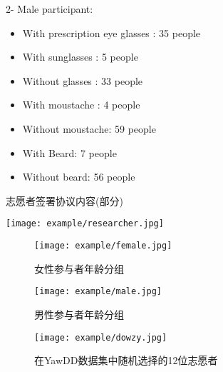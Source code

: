 2- Male participant:
\begin{itemize}
    \item With prescription eye glasses : 35 people
    \item With sunglasses : 5 people
    \item Without glasses : 33 people
    \item With moustache : 4 people
    \item Without moustache: 59 people
    \item With Beard: 7 people
    \item Without beard: 56 people
\end{itemize}

\begin{table}[!htp]

\centering
\caption{志愿者签署协议内容(部分)}
\texttt{[image: example/researcher.jpg]}
\label{table:2-8}

\end{table}


\begin{figure}[!htp]

\centering
\texttt{[image: example/female.jpg]}
\caption{女性参与者年龄分组}
\label{figure:1-7}

\end{figure}

\begin{figure}[!htp]

\centering
\texttt{[image: example/male.jpg]}
\caption{男性参与者年龄分组}
\label{figure:1-8}

\end{figure}

\begin{figure}[!htp]

\centering
\texttt{[image: example/dowzy.jpg]}
\caption{在YawDD数据集中随机选择的12位志愿者}
\label{figure:1-8}

\end{figure}

